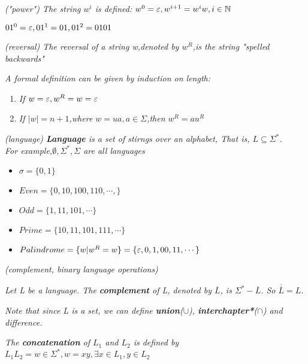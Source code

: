 \documentclass{article}
\begin{document}
\begin{defn}
    \textit{("power") The string $w^i$ is defined: $w^0 = \varepsilon,w^{i+1}=w^iw,i \in \mathbb{N}$}
\end{defn}
\begin{example}
    $01^0 = \varepsilon, 01^1 = 01, 01^2 = 0101$
\end{example}
\begin{defn}
    \textit{(reversal) The reversal of a string w,denoted by $w^R$,is the string "spelled backwards"}

    \textit{A formal definition can be given by induction on length:}

    \begin{enumerate}
        \item \textit{If $w = \varepsilon,w^R = w = \varepsilon$}
        \item \textit{If $|w| = n+1$,where $w = ua,a\in \Sigma$,then $w^R = au^R$}
    \end{enumerate}
\end{defn}

\begin{defn}
    \textit{(language) \textbf{Language} is a set of stirngs over an alphabet, That is, $L\subseteq \Sigma^*$.\\ \indent For example,$\emptyset,\Sigma^*,\Sigma$ are all languages}
    \begin{itemize}
        \item $\sigma = \{0,1\}$
        \item $Even = \{0,10,100,110,\cdots,\}$
        \item $Odd = \{1,11,101,\cdots\}$
        \item $Prime = \{10,11,101,111,\cdots\}$
        \item $Palindrome = \{w|w^R=w\}=\{\varepsilon,0,1,00,11,\cdots\}$
    \end{itemize}
\end{defn}

\begin{defn}
    \textit{(complement, binary language operations)}

    \textit{Let L be a language. The \textbf{complement} of L, denoted by $\overline{L}$, is $\Sigma^*-\overline{L}$. So $\overline {\overline{L}}= L$.}

    \textit{Note that since L is a set, we can define \textbf{union}($\cup$), \textbf{interchapter*}($\cap$) and difference.}

    \textit{The \textbf{concatenation} of $L_1$ and $L_2$ is defined by $L_1L_2 = {w \in \Sigma^*, w = xy, \exists x \in L_1, y \in L_2}$}
\end{defn}
\end{document}
